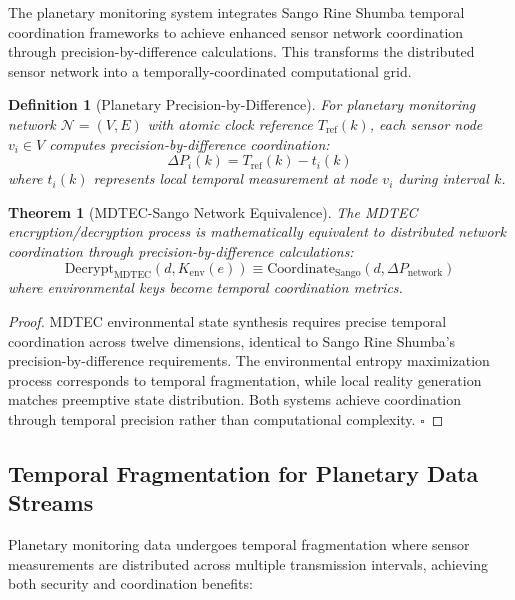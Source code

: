 \documentclass[12pt,a4paper]{article}
\newtheorem{theorem}{Theorem}
\newtheorem{definition}{Definition}
\begin{document}
The planetary monitoring system integrates Sango Rine Shumba temporal coordination frameworks \citep{sachikonye2024sango} to achieve enhanced sensor network coordination through precision-by-difference calculations. This transforms the distributed sensor network into a temporally-coordinated computational grid.

\begin{definition}[Planetary Precision-by-Difference]
For planetary monitoring network $\mathcal{N} = (V, E)$ with atomic clock reference $T_{\text{ref}}(k)$, each sensor node $v_i \in V$ computes precision-by-difference coordination:
\begin{equation}
\Delta P_i(k) = T_{\text{ref}}(k) - t_i(k)
\end{equation}
where $t_i(k)$ represents local temporal measurement at node $v_i$ during interval $k$.
\end{definition}

\begin{theorem}[MDTEC-Sango Network Equivalence]
The MDTEC encryption/decryption process is mathematically equivalent to distributed network coordination through precision-by-difference calculations:
\begin{equation}
\text{Decrypt}_{\text{MDTEC}}(d, K_{\text{env}}(e)) \equiv \text{Coordinate}_{\text{Sango}}(d, \Delta P_{\text{network}})
\end{equation}
where environmental keys become temporal coordination metrics.
\end{theorem}

\begin{proof}
MDTEC environmental state synthesis requires precise temporal coordination across twelve dimensions, identical to Sango Rine Shumba's precision-by-difference requirements. The environmental entropy maximization process corresponds to temporal fragmentation, while local reality generation matches preemptive state distribution. Both systems achieve coordination through temporal precision rather than computational complexity. $\square$
\end{proof}

\subsection{Temporal Fragmentation for Planetary Data Streams}

Planetary monitoring data undergoes temporal fragmentation where sensor measurements are distributed across multiple transmission intervals, achieving both security and coordination benefits:
\end{document}
